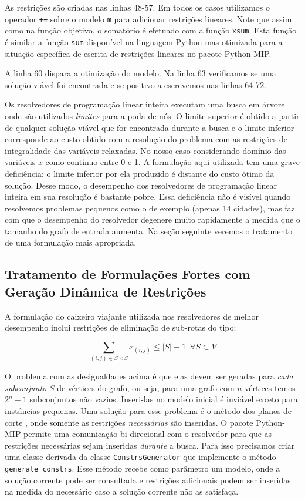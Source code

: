 \documentclass[a4paper,11pt,fleqn]{article}
\begin{document}
As restrições são criadas nas linhas 48-57. Em todos os casos utilizamos o operador \texttt{+=} sobre o modelo \texttt{m} para adicionar restrições lineares. Note que assim como na função objetivo, o somatório é efetuado com a função \texttt{xsum}. Esta função é similar a função \texttt{sum} disponível na linguagem Python mas otimizada para a situação específica de escrita de restrições lineares no pacote Python-MIP\@. 

A linha 60 dispara a otimização do modelo. Na linha 63 verificamos se uma solução viável foi encontrada e se positivo a escrevemos nas linhas 64-72.

Os resolvedores de programação linear inteira executam uma busca em árvore onde são utilizados \emph{limites} para a poda de nós. O limite superior é obtido a partir de qualquer solução viável que for encontrada durante a busca e o limite inferior corresponde ao custo obtido com a resolução do problema com as restrições de integralidade das variáveis relaxadas. No nosso caso considerando domínio das variáveis $x$ como contínuo entre 0 e 1. A formulação aqui utilizada tem uma grave deficiência: o limite inferior por ela produzido é distante do custo ótimo da solução. Desse modo, o desempenho dos resolvedores de programação linear inteira em sua resolução é bastante pobre. Essa deficiência não é visível quando resolvemos problemas pequenos como o de exemplo (apenas 14 cidades), mas faz com que o desempenho do resolvedor degenere muito rapidamente a medida que o tamanho do grafo de entrada aumenta. Na seção seguinte veremos o tratamento de uma formulação mais apropriada. 


\subsection{Tratamento de Formulações Fortes com Geração Dinâmica de Restrições}

A formulação do caixeiro viajante utilizada nos resolvedores de melhor desempenho inclui restrições de eliminação de sub-rotas do tipo:

\begin{equation}
	\sum_{(i,j) \in S \times S} x_{(i,j)} \leq |S|-1 \,\,\, \forall S \subset V \label{consSubTour}
\end{equation}

O problema com as desigualdades acima é que elas devem ser geradas para \emph{cada subconjunto} $S$ de vértices do grafo, ou seja, para uma grafo com $n$ vértices temos $2^n-1$ subconjuntos não vazios. Inseri-las no modelo inicial é inviável exceto para instâncias pequenas. Uma solução para esse problema é o método dos planos de corte \citep{Dantzig54}, onde somente as restrições \emph{necessárias} são inseridas. O pacote Python-MIP permite uma comunicação bi-direcional com o resolvedor para que as restrições necessárias sejam inseridas \emph{durante} a busca. Para isso precisamos criar uma classe derivada da classe \texttt{ConstrsGenerator} que implemente o método \texttt{generate\_constrs}. Esse método recebe como parâmetro um modelo, onde a solução corrente pode ser consultada e restrições adicionais podem ser inseridas na medida do necessário caso a solução corrente não as satisfaça. 
\end{document}
